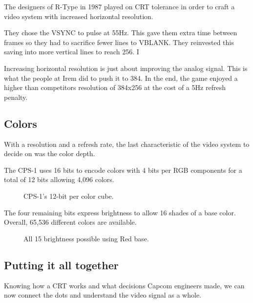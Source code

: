 \pagebreak
\begin{trivia}
The designers of R-Type in 1987 played on CRT tolerance in order to craft a video system with increased horizontal resolution. 

They chose the VSYNC to pulse at 55Hz. This gave them extra time between frames so they had to sacrifice fewer lines to VBLANK. They reinvested this saving into more vertical lines to reach 256. I

Increasing horizontal resolution is just about improving the analog signal. This is what the people at Irem did to push it to 384. In the end, the game enjoyed a higher than competitors resolution of 384x256 at the cost of a 5Hz refresh penalty.
\end{trivia}



\subsection{Colors}
With a resolution and a refresh rate, the last characteristic of the video system to decide on was the color depth. 

The CPS-1 uses 16 bits to encode colors with 4 bits per RGB components for a total of 12 bits allowing 4,096 colors. 


\begin{figure}[H]
\begin{minipage}[t]{0.49\linewidth}
\end{minipage}%
\hfill%
\begin{minipage}[t]{0.49\linewidth}
\end{minipage}
\caption*{CPS-1's 12-bit per color cube.}
\end{figure}
  
The four remaining bits express brightness to allow 16 shades of a base color. Overall, 65,536 different colors are available.

\begin{figure}[H]
\caption*{All 15 brightness possible using Red  base.}
\end{figure}

\subsection{Putting it all together}

Knowing how a CRT works and what decisions Capcom engineers made, we can now connect the dots and understand the video signal as a whole.

